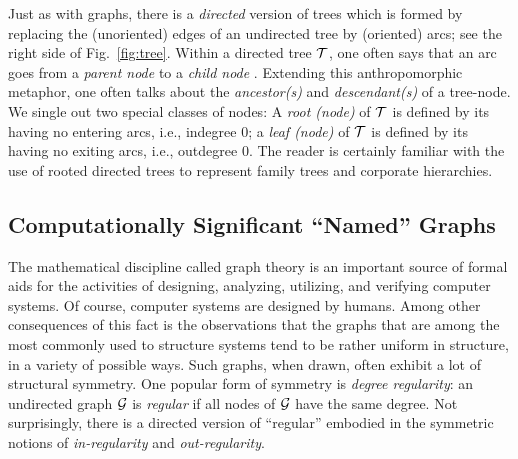 Just as with graphs, there is a {\em directed} version of trees which
is formed by replacing the (unoriented) edges of an undirected tree by
(oriented) arcs; see the right side of Fig.~\ref{fig:tree}.  Within a directed tree
$\mbox{$\cal T$}$, one often says that an arc goes from a {\it parent node}
 to a {\it child node} .  Extending this anthropomorphic metaphor, one often talks
about the {\it ancestor(s)}  and {\it
  descendant(s)}  of a tree-node.  We
single out two special classes of nodes: A {\it root (node)}
  of $\mbox{$\cal T$}$ is
defined by its having no entering arcs, i.e., indegree $0$; a {\it
  leaf (node)}   of $\mbox{$\cal T$}$ is defined by its having no exiting arcs, i.e.,
outdegree $0$.  The reader is certainly familiar with the use of
rooted directed trees to represent family trees and corporate
hierarchies.


\subsection{Computationally Significant ``Named'' Graphs}
\label{sec:graphs-important-families}

The mathematical discipline called graph theory is an important source
of formal aids for the activities of designing, analyzing, utilizing,
and verifying computer systems.  Of course, computer systems are
designed by humans.  Among other consequences of this fact is the
observations that the graphs that are among the most commonly used to
structure systems tend to be rather uniform in structure, in a variety
of possible ways.  Such graphs, when drawn, often exhibit a lot of
structural symmetry.  One popular form of symmetry is {\it degree
  regularity}: an undirected graph $\mbox{$\cal G$}$ is {\it regular}
 if all nodes of $\mbox{$\cal G$}$ have the same degree.  Not
surprisingly, there is a directed version of ``regular'' embodied in the
symmetric notions of {\it in-regularity}
 and {\it out-regularity}.

\medskip

